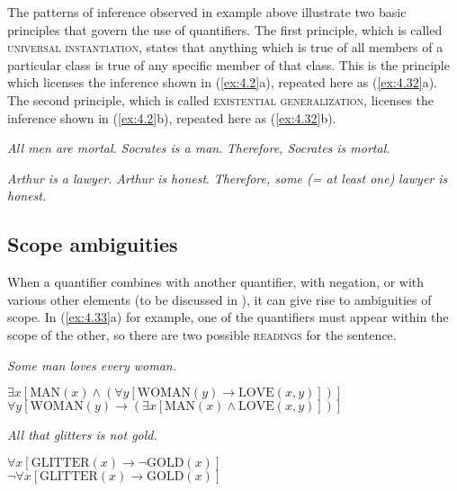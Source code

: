 The patterns of inference observed in example  above illustrate two basic principles that govern the use of quantifiers. The first principle, which is called \textsc{universal instantiation}, states that anything which is true of all members of a particular class is true of any specific member of that class. This is the principle which licenses the inference shown in (\ref{ex:4.2}a), repeated here as (\ref{ex:4.32}a). The second principle, which is called \textsc{existential generalization}, licenses the inference shown in (\ref{ex:4.2}b), repeated here as (\ref{ex:4.32}b).

\settowidth{}
\ea \label{ex:4.32}
\ea  \textit{All men are mortal.}  
\textit{Socrates is a man}.        
\FelixHRule
\textit{Therefore, Socrates is mortal.}  
\bigskip

\ex   \textit{Arthur is a lawyer.}                
\textit{Arthur is honest}.                        
\FelixHRule
\textit{Therefore, some (= at least one)}  
\hspace{.5em} \textit{lawyer is honest.}
\z \z

\subsection{Scope ambiguities}\label{sec:4.4.2}

When a quantifier combines with another quantifier, with negation, or with various other elements (to be discussed in ), it can give rise to ambiguities of scope. In (\ref{ex:4.33}a) for example, one of the quantifiers must appear within the scope of the other, so there are two possible \textsc{readings} for the sentence.\largerpage


\ea \label{ex:4.33}
\ea \textit{Some man loves every woman.}\\
  \begin{xlisti} 
      \ex $\exists x[\text{MAN}(x) \wedge (\forall y[\text{WOMAN}(y) \rightarrow \text{LOVE}(x,y)])]$\\
      \ex $\forall y[\text{WOMAN}(y) \rightarrow (\exists x[\text{MAN}(x) \wedge \text{LOVE}(x,y)])]$
  \end{xlisti} 
\ex  \textit{All that glitters is not gold.}\\
  \begin{xlisti}
  \ex $\forall x[\text{GLITTER}(x) \rightarrow \neg\text{GOLD}(x)]$\\
  \ex $\neg \forall x[\text{GLITTER}(x) \rightarrow \text{GOLD}(x)]$
  \end{xlisti}
\z \z


